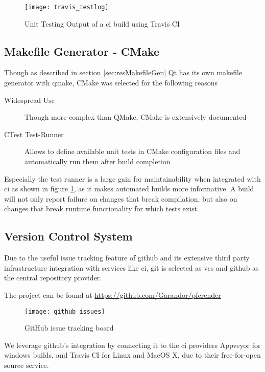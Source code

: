 \begin{figure}[htb]
	\texttt{[image: travis\_testlog]}
	\caption{Unit Testing Output of a \gls{ci} build using Travis CI}
	\label{fig:travistest}
\end{figure}

\subsection{Makefile Generator - CMake}\label{sec:archcmake}
Though as described in section \ref{sec:resMakefileGen} Qt has its own makefile generator with qmake, CMake was selected for the following reasons
\begin{description}
	\item[Widespread Use] Though more complex than QMake, CMake is extensively documented
	\item[CTest Test-Runner] Allows to define available unit tests in CMake configuration files and automatically run them after build completion 
\end{description}

Especially the test runner is a large gain for maintainability when integrated with \gls{ci} as shown in figure \ref{fig:travistest}, as it makes automated builds more informative.
A build will not only report failure on changes that break compilation, but also on changes that break runtime functionality for which tests exist.

\subsection{Version Control System}\label{sec:archvcs}
Due to the useful issue tracking feature of \gls{github} and its extensive third party infrastructure integration with services like \gls{ci}, \gls{git} is selected as \gls{vcs} and \gls{github} as the central repository provider.

The project can be found at \url{https://github.com/Garandor/pfcrender}

\begin{figure}[htb]
	\texttt{[image: github\_issues]}
	\caption{GitHub issue tracking board}
	\label{fig:githubissues}
\end{figure}

We leverage \gls{github}'s integration by connecting it to the \gls{ci} providers Appveyor for windows builds, and Travis CI for Linux and MacOS X, due to their free-for-open source service.

